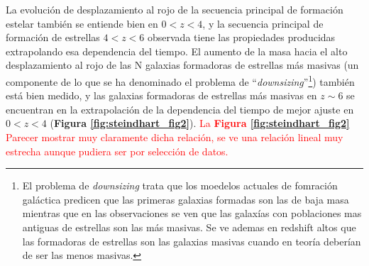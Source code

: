 \documentclass{article}
\begin{document}
La evolución de desplazamiento al rojo de la secuencia principal de formación estelar también se entiende bien en $0<z<4$, y la secuencia principal de formación de estrellas $4<z<6$ observada tiene las propiedades producidas extrapolando esa dependencia del tiempo. El aumento de la masa hacia el alto desplazamiento al rojo de las N galaxias formadoras de estrellas más masivas (un componente de lo que se ha denominado el problema de ``\textit{downsizing}''\footnote{El problema de \textit{downsizing} trata que los moedelos actuales de fomración galáctica predicen que las primeras galaxias formadas son las de baja masa mientras que en las observaciones se ven que las galaxías con poblaciones mas antiguas de estrellas son las más masivas. Se ve ademas en redshift altos que las formadoras de estrellas son las galaxias masivas cuando en teoría deberían de ser las menos masivas.}) también está bien medido, y las galaxias formadoras de estrellas más masivas en $z\sim6$ se encuentran en la extrapolación de la dependencia del tiempo de mejor ajuste en $0<z<4$ (\textbf{Figura \ref{fig:steindhart_fig2}}). \textcolor{red}{La \textbf{Figura \ref{fig:steindhart_fig2}} Parecer mostrar muy claramente dicha relación, se ve una relación lineal muy estrecha aunque pudiera ser por selección de datos.} \\
\end{document}
